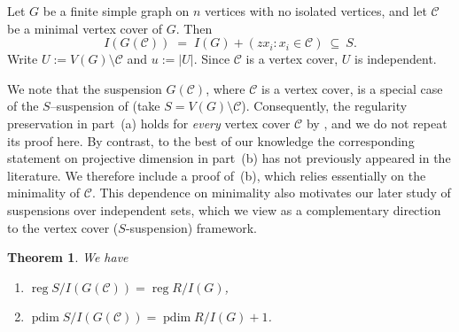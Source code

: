 \documentclass[12pt]{amsart}
\theoremstyle{plain}
\newtheorem{thm}{Theorem}[section]
\theoremstyle{definition}
\DeclareMathOperator{\reg}{reg}
\DeclareMathOperator{\pdim}{pdim}
\begin{document}
Let $G$ be a finite simple graph on $n$ vertices with no isolated vertices, and let $\mathcal C$ be a
minimal vertex cover of $G$.  Then
\[
I(G(\mathcal C)) \;=\; I(G) + (zx_i : x_i\in \mathcal C)\ \subseteq\ S.
\]
Write $U:=V(G)\setminus \mathcal C$ and $u:=|U|$. Since $\mathcal C$ is a vertex cover, $U$ is
independent.


We note that the suspension $G(\mathcal C)$, where $\mathcal C$ is a vertex cover, is a special case of the $S$--suspension of \cite{IndMatch} (take $S=V(G)\setminus \mathcal C$). Consequently, the regularity preservation in part~(a) holds for \emph{every} vertex cover $\mathcal C$ by \cite[Lemma~1.5]{IndMatch}, and we do not repeat its proof here. By contrast, to the best of our knowledge the corresponding statement on projective dimension in part~(b) has not previously appeared in the literature. We therefore include a proof of~(b), which relies essentially on the minimality of $\mathcal C$. This dependence on minimality also motivates our later study of suspensions over independent sets, which we view as a complementary direction to the vertex cover ($S$-suspension) framework.


\begin{thm}\label{thm:cover-cone-reg-pdim}
We have
\begin{enumerate}
\item[(a)] $\reg S/I(G(\mathcal C)) = \reg R/I(G)$,
\item[(b)] $\pdim S/I(G(\mathcal C)) = \pdim R/I(G)+1$.
\end{enumerate}
\end{thm}
\end{document}
